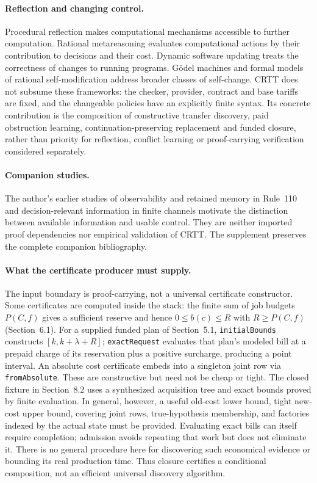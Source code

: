 \documentclass[10pt,letterpaper]{article}
\newcommand{\rc}[1]{\texttt{#1}}
\begin{document}
\paragraph{Reflection and changing control.}
Procedural reflection \cite{smith1984} makes computational mechanisms accessible to further computation. Rational metareasoning \cite{russell1991} evaluates computational actions by their contribution to decisions and their cost. Dynamic software updating \cite{stoyle2007} treats the correctness of changes to running programs. G\"odel machines \cite{schmidhuber2007} and formal models of rational self-modification \cite{everitt2016} address broader classes of self-change. CRTT does not subsume these frameworks: the checker, provider, contract and base tariffs are fixed, and the changeable policies have an explicitly finite syntax. Its concrete contribution is the composition of constructive transfer discovery, paid obstruction learning, continuation-preserving replacement and funded closure, rather than priority for reflection, conflict learning or proof-carrying verification considered separately.

\paragraph{Companion studies.}
The author's earlier studies of observability and retained memory in Rule~110 \cite{strand110observer2026,strand110memory2026} and decision-relevant information in finite channels \cite{strandcontrol2026} motivate the distinction between available information and usable control. They are neither imported proof dependencies nor empirical validation of CRTT. The supplement preserves the complete companion bibliography.

\paragraph{What the certificate producer must supply.}
The input boundary is proof-carrying, not a universal certificate constructor. Some certificates are computed inside the stack: the finite sum of job budgets $P(C,f)$ gives a sufficient reserve and hence $0\le b(c)\le R$ with $R\ge P(C,f)$ (Section~6.1). For a supplied funded plan of Section~5.1, \rc{initialBounds} constructs $[k,k+\lambda+R]$; \rc{exactRequest} evaluates that plan's modeled bill at a prepaid charge of its reservation plus a positive surcharge, producing a point interval. An absolute cost certificate embeds into a singleton joint row via \rc{fromAbsolute}. These are constructive but need not be cheap or tight. The closed fixture in Section~8.2 uses a synthesized acquisition tree and exact bounds proved by finite evaluation. In general, however, a useful old-cost lower bound, tight new-cost upper bound, covering joint rows, true-hypothesis membership, and factories indexed by the actual state must be provided. Evaluating exact bills can itself require completion; admission avoids repeating that work but does not eliminate it. There is no general procedure here for discovering such economical evidence or bounding its real production time. Thus closure certifies a conditional composition, not an efficient universal discovery algorithm.
\end{document}
